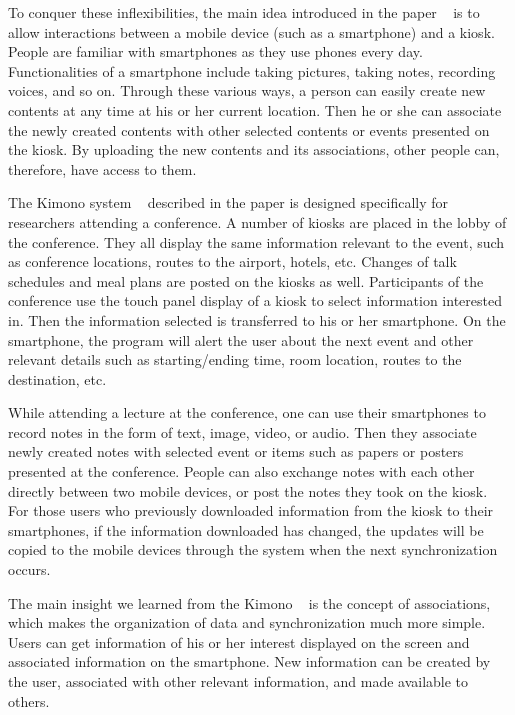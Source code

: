 \documentclass{sigchi}
\begin{document}
To conquer these inflexibilities, the main idea introduced in the paper ~\cite{huang2005kimono} is to allow interactions between a mobile device (such as a smartphone) and a kiosk. People are familiar with smartphones as they use phones every day. Functionalities of a smartphone include taking pictures, taking notes, recording voices, and so on. Through these various ways, a person can easily create new contents at any time at his or her current location. Then he or she can associate the newly created contents with other selected contents or events presented on the kiosk. By uploading the new contents and its associations, other people can, therefore, have access to them.


The Kimono system ~\cite{huang2005kimono} described in the paper is designed specifically for researchers attending a conference. A number of kiosks are placed in the lobby of the conference. They all display the same information relevant to the event, such as conference locations, routes to the airport, hotels, etc. Changes of talk schedules and meal plans are posted on the kiosks as well. Participants of the conference use the touch panel display of a kiosk to select information interested in. Then the information selected is transferred to his or her smartphone. On the smartphone, the program will alert the user about the next event and other relevant details such as starting/ending time, room location, routes to the destination, etc.


While attending a lecture at the conference, one can use their smartphones to record notes in the form of text, image, video, or audio. Then they associate newly created notes with selected event or items such as papers or posters presented at the conference. People can also exchange notes with each other directly between two mobile devices, or post the notes they took on the kiosk. For those users who previously downloaded information from the kiosk to their smartphones, if the information downloaded has changed, the updates will be copied to the mobile devices through the system when the next synchronization occurs. 


The main insight we learned from the Kimono ~\cite{huang2005kimono} is the concept of associations, which makes the organization of data and synchronization much more simple. Users can get information of his or her interest displayed on the screen and associated information on the smartphone. New information can be created by the user, associated with other relevant information, and made available to others.
\end{document}
